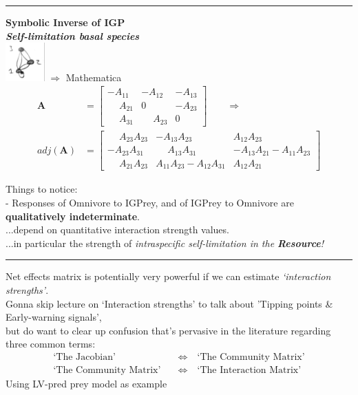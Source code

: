 \documentclass{article}
\newcommand{\ind}{\-\hspace{1cm}}
\begin{document}
\rule[0.5ex]{\linewidth}{1pt}

\textbf{Symbolic Inverse of IGP}\\
\emph{\textbf{Self-limitation basal species}}\\
\includegraphics[width=1.5cm]{figs/IGP_basal.pdf}
 $\Rightarrow$ Mathematica
\begin{align*}
	\mathbf{A}&=\begin{bmatrix}
	 -A_{11} & -A_{12} & -A_{13} \\
	 \phantom{-}A_{21} & 0 & -A_{23} \\
	 \phantom{-}A_{31} & \phantom{-}A_{23} & 0  \end{bmatrix} \qquad \Rightarrow\\
	 adj(\mathbf{A})&=\begin{bmatrix}
	  \phantom{-}A_{23}A_{23} & -A_{13} A_{23} & A_{12} A_{23} \\
	  -A_{23} A_{31} & \phantom{-}A_{13} A_{31} & \boxed{-A_{13} A_{21}-A_{11} A_{23}} \\
	  \phantom{-}A_{21} A_{23} & \boxed{A_{11} A_{23}-A_{12} A_{31}} & A_{12} A_{21}  \end{bmatrix}
\end{align*}

Things to notice:\\
\ind - Responses of Omnivore to IGPrey, and of IGPrey to Omnivore are \textbf{qualitatively indeterminate}.\\
\ind \ind  ...depend on quantitative interaction strength values.\\
\ind \ind \ind ...in particular the strength of \emph{intraspecific self-limitation in the \textbf{Resource}!}

\rule[0.5ex]{\linewidth}{1pt}
Net effects matrix is potentially very powerful if we can estimate \emph{`interaction strengths'}.\\
Gonna skip lecture on `Interaction strengths' to talk about 'Tipping points \& Early-warning signals',\\
\ind but do want to clear up confusion that's pervasive in the literature regarding three common terms:
\begin{align*}
	\text{`The Jacobian'} \quad &\Leftrightarrow \quad \text{`The Community Matrix'}\\
	\text{`The Community Matrix'}\quad &\Leftrightarrow \quad \text{`The Interaction Matrix'}
\end{align*}
Using LV-pred prey model as example
\end{document}
